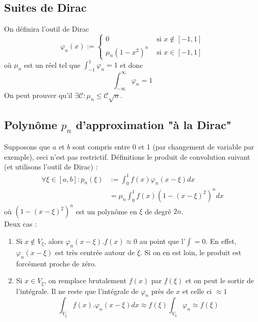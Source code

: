 	\subsection{Suites de Dirac}
	On définira l'outil de Dirac 
	\begin{equation}
	\varphi_n(x) := \left\{\begin{array}{ll}
	0 & \text{ si } x \notin [-1,1]\\
	\mu_n(1-x^2)^n & \text{ si } x \in [-1,1]	
	\end{array}\right.
	\end{equation}
	où $\mu_n$ est un réel tel que $\int_{-1}^1 \varphi_n = 1$ et donc 
	\begin{equation}
	\int_{-\infty}^\infty \varphi_n = 1
	\end{equation}
	On peut prouver qu'il $\exists\mathcal{C} : \mu_n \leq \mathcal{C}\sqrt{n}$.\\
	
	
	\subsection{Polynôme $p_n$ d'approximation "à la Dirac"}
	Supposons que $a$ et $b$ sont compris entre 0 et 1 (par changement de variable 
	par exemple), ceci n'est pas restrictif. Définitions le produit de convolution 
	suivant (et utilisons l'outil de Dirac) :
	\begin{equation}
	\begin{array}{ll}
	\forall \xi \in [a,b] : p_n(\xi) &:= \int_0^1 f(x)\varphi_n(x-\xi)dx\\
	 &= \mu_n\int_0^1 f(x)(1-(x-\xi)^2)^ndx
	\end{array}
	\end{equation}
	où $(1-(x-\xi)^2)^n$ est un polynôme en $\xi$ de degré $2n$.\\
	Deux cas :
	\begin{enumerate}
	\item Si $x \notin V_\xi$, alors $\varphi_n(x-\xi).f(x) \approx 0$ au point 
	que l'$\int = 0$. En effet, $\varphi_n(x-\xi)$ est très centrée autour de 
	$\xi$. Si on en est loin, le produit est forcément proche de zéro.
	\item Si $x \in V_\xi$, on remplace brutalement $f(x)$ par $f(\xi)$ et on peut 
	le sortir de l'intégrale. Il ne reste que l'intégrale de $\varphi_n$ près de $x$ 
	et celle ci $\approx 1$
	\begin{equation}
	\int_{V_\xi} f(x).\varphi_n(x-\xi)dx \approx f(\xi)\int_{V_0}\varphi_n \approx 
	f(\xi)
	\end{equation}
	\end{enumerate}
	
